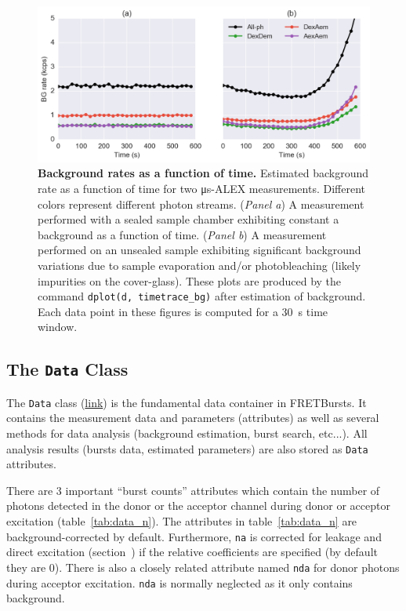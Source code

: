 \documentclass[10pt,letterpaper]{article}
\begin{document}
\begin{figure}[h!]
\begin{center}
\includegraphics[width=0.91\columnwidth]{figures/background_timetrace/background_timetrace}
\caption{\label{fig:bg_timetrace} \textbf{Background rates as a function of time.}
Estimated background rate as a function of time for two μs-ALEX measurements.
Different colors represent different photon streams.
(\textit{Panel a}) A measurement performed with a sealed sample chamber
exhibiting constant a background as a function of time.
(\textit{Panel b}) A measurement performed on an unsealed sample exhibiting
significant background variations due to sample evaporation and/or
photobleaching (likely impurities on the cover-glass).
These plots are produced by the command
\texttt{dplot(d, timetrace\_bg)} after estimation of background.
Each data point in these figures is computed for a 30~s time window.%
}
\end{center}
\end{figure}


\subsection*{The \texttt{Data} Class}
\label{sec:data_intro}

The \verb|Data| class
(\href{http://fretbursts.readthedocs.org/en/latest/data_class.html}{link})
is the fundamental data container in FRETBursts. It contains the
measurement data and parameters (attributes) as well as several methods
for data analysis (background estimation, burst search, etc...).
All analysis results (bursts data, estimated parameters) are also stored
as \verb|Data| attributes.

There are 3 important ``burst counts'' attributes which contain
the number of photons detected in the donor or the acceptor channel
during donor or acceptor excitation (table~\ref{tab:data_n}).
The attributes in table~\ref{tab:data_n} are background-corrected by default.
Furthermore, \verb|na| is corrected for leakage and direct excitation
(section~) if the relative coefficients are specified
(by default they are 0).
There is also a closely related attribute named \verb|nda| for donor photons
during acceptor excitation. \verb|nda| is normally neglected as it only contains
background.
\end{document}
